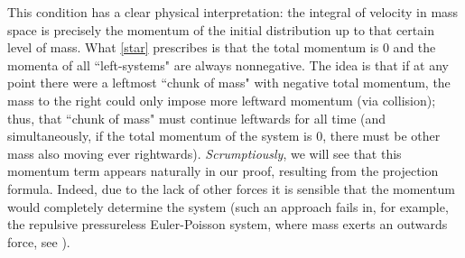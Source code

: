 \documentclass[10pt,a4paper]{amsart}
\newcommand{\comm}[1]{}
\newtheorem{cor}[thm]{Corollary}
\numberwithin{equation}{section}
\begin{document}
    This condition has a clear physical interpretation: the integral of velocity in mass space is precisely the momentum of the initial distribution up to that certain level of mass. What \eqref{star} prescribes is that the total momentum is $0$ and the momenta of all ``left-systems" are always nonnegative. The idea is that if at any point there were a leftmost ``chunk of mass" with negative total momentum, %
    the mass to the right could only impose more leftward momentum (via collision); thus, that ``chunk of mass" must continue leftwards for all time (and simultaneously, if the total momentum of the system is 0, there must be other mass also moving ever rightwards). \textit{Scrumptiously}\comm{{\color{red} you guys are gonna make me remove this but I think it's a good word in this context} No, it is appropriate here. - Joseph}, we will see that this momentum term appears naturally in our proof, resulting from the projection formula. Indeed, due to the lack of other forces it is sensible that the momentum would completely determine the system (such an approach fails in, for example, the repulsive pressureless Euler-Poisson system, where mass exerts an outwards force, see \cite{Repulsive-Paper}). 
\end{document}
